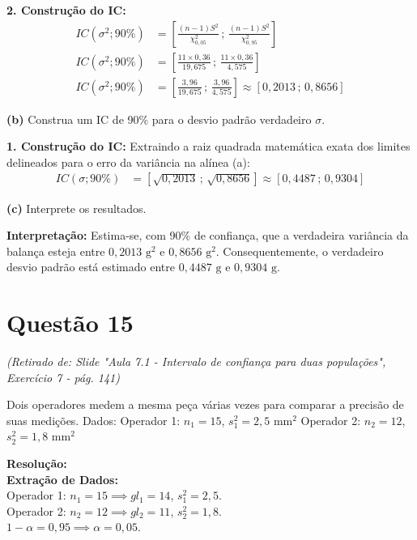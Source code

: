 \documentclass[12pt, a4paper]{article}
\begin{document}
\noindent \textbf{2. Construção do IC:}
\begin{align*}
IC(\sigma^2; 90\%) &= \left[ \frac{(n-1)S^2}{\chi^2_{0{,}05}} \,;\, \frac{(n-1)S^2}{\chi^2_{0{,}95}} \right] \\
IC(\sigma^2; 90\%) &= \left[ \frac{11 \times 0{,}36}{19{,}675} \,;\, \frac{11 \times 0{,}36}{4{,}575} \right] \\
IC(\sigma^2; 90\%) &= \left[ \frac{3{,}96}{19{,}675} \,;\, \frac{3{,}96}{4{,}575} \right] \approx \boxed{[0{,}2013 \,;\, 0{,}8656]}
\end{align*}

\medskip\noindent\textbf{(b)} Construa um IC de 90\% para o desvio padrão verdadeiro $\sigma$.

\noindent \textbf{1. Construção do IC:}
Extraindo a raiz quadrada matemática exata dos limites delineados para o erro da variância na alínea (a):
\begin{align*}
IC(\sigma; 90\%) &= [\sqrt{0{,}2013} \,;\, \sqrt{0{,}8656}] \approx \boxed{[0{,}4487 \,;\, 0{,}9304]}
\end{align*}

\medskip\noindent\textbf{(c)} Interprete os resultados.

\noindent \textbf{Interpretação:} Estima-se, com 90\% de confiança, que a 
verdadeira variância da balança esteja entre $0{,}2013 \text{ g}^2$ e 
$0{,}8656 \text{ g}^2$. Consequentemente, o verdadeiro desvio padrão 
está estimado entre $0{,}4487 \text{ g}$ e $0{,}9304 \text{ g}$.

\section*{Questão 15}
\textit{(Retirado de: Slide "Aula 7.1 - Intervalo de confiança para duas populações", Exercício 7 - pág. 141)}

Dois operadores medem a mesma peça várias vezes para comparar a precisão de suas medições. Dados:
Operador 1: $n_1 = 15$, $s^2_1 = 2{,}5 \text{ mm}^2$
Operador 2: $n_2 = 12$, $s^2_2 = 1{,}8 \text{ mm}^2$

\vspace{0.3cm}
\noindent\textbf{Resolução:}\\
\textbf{Extração de Dados:} \\
Operador 1: $n_1 = 15 \implies gl_1 = 14$, $s^2_1 = 2{,}5$. \\
Operador 2: $n_2 = 12 \implies gl_2 = 11$, $s^2_2 = 1{,}8$. \\
$1-\alpha = 0{,}95 \implies \alpha = 0{,}05$.
\end{document}
